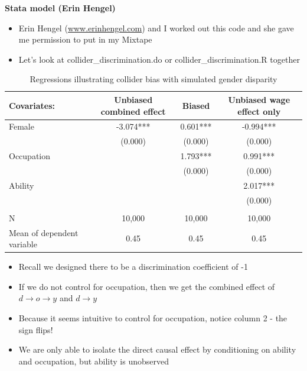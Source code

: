 \documentclass[notes=show]{beamer}
\begin{document}
\begin{frame}[plain]
\begin{center}
\textbf{Stata model (Erin Hengel)}
\end{center}

\begin{itemize}

\item Erin Hengel (\url{www.erinhengel.com}) and I worked out this code and she gave me permission to put in my Mixtape
\item Let's look at collider\_discrimination.do or collider\_discrimination.R together
\end{itemize}

\end{frame}

\begin{frame}[plain, shrink=20]

\begin{table}[htbp]\centering
\scriptsize
\caption{Regressions illustrating collider bias with simulated gender disparity}
\begin{center}
\begin{tabular}{l*{3}{c}}
\toprule
\multicolumn{1}{l}{Covariates: }&
\multicolumn{1}{c}{\textbf{Unbiased combined effect}}&
\multicolumn{1}{c}{\textbf{Biased }}&
\multicolumn{1}{c}{\textbf{Unbiased wage effect only}}\\
\midrule
Female                 	&	-3.074***	&	0.601*** 	& -0.994*** \\
                    		&	(0.000)	&	(0.000)	& (0.000) \\
Occupation		&			&	1.793*** 	& 0.991*** \\
                 	   	&			&	(0.000)	& (0.000) \\
Ability			&			&			& 2.017*** \\
				&			&			& (0.000) \\
\\
\midrule
N                   &       10,000   &       10,000   &       10,000   \\
Mean of dependent variable&      0.45   &      0.45  & 0.45  \\
\bottomrule
\end{tabular}
\end{center}
\end{table}

\begin{itemize}
\item Recall we designed there to be a discrimination coefficient of -1
\item If we do not control for occupation, then we get the combined effect of $d \rightarrow o \rightarrow y$ and $d  \rightarrow y$
\item Because it seems intuitive to control for occupation, notice column 2 - the sign flips!
\item We are only able to isolate the direct causal effect by conditioning on ability and occupation, but ability is unobserved
\end{itemize}

\end{frame}
\end{document}
